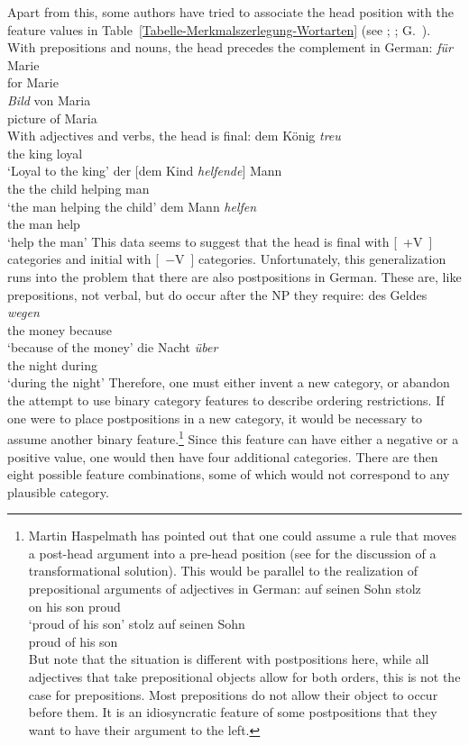 Apart from this, some authors have tried to associate the head position with the feature values in Table~\ref{Tabelle-Merkmalszerlegung-Wortarten} (see \eg \citealp[]{Grewendorf88a};
\citealp[]{Haftka96a}; G.\ \citealp[]{GMueller2011a}). With prepositions and nouns,
the head precedes the complement in German:
\eal
\ex
\gll \emph{für} Marie\\
	 for Marie\\
\ex 
\gll \emph{Bild} von Maria\\
	 picture of Maria\\
\zl
With adjectives and verbs, the head is final:
\eal
\ex 
\gll dem König \emph{treu}\\
     the king loyal\\
\glt `Loyal to the king'
\ex 
\gll der [dem Kind \emph{helfende}] Mann\\
     the the child helping man\\
\glt `the man helping the child'
\ex 
\gll dem Mann \emph{helfen}\\
     the man help\\
\glt `help the man'
\zl
This data seems to suggest that the head is final with [~+V~] categories and initial with [~$-$V~] categories. Unfortunately, this
generalization runs into the problem that there are also postpositions in German. These are, like
prepositions, not verbal, but do occur after the NP they require: 
\eal
\ex 
\gll des Geldes \emph{wegen}\\
     the money because\\
\glt `because of the money'
\ex 
\gll die Nacht \emph{über}\\
     the night during\\
\glt `during the night'
\zl
Therefore, one must either invent a new category, or abandon the attempt to use binary category features to describe ordering restrictions.
If one were to place postpositions in a new category, it would be necessary to assume another binary
feature.\footnote{%
Martin Haspelmath has pointed out that one could assume a rule that moves a
post-head argument into a pre-head position (see \citealp[]{Riemsdijk78a} for the discussion
of a transformational solution). This would be parallel to the realization of
prepositional arguments of adjectives in German:
\eal
\ex
\gll auf seinen Sohn stolz\\
     on  his son proud\\
\glt `proud of his son'
\ex 
\gll stolz auf seinen Sohn\\
     proud of his son\\
\zl
But note that the situation is different with postpositions here, while all adjectives that take
prepositional objects allow for both orders, this is not the case for prepositions. Most
prepositions do not allow their object to occur before them. It is an idiosyncratic feature of some
postpositions that they want to have their argument to the left.%
} 
Since this feature can have either a negative or a positive value, one would then have four
additional categories. There are then eight possible feature combinations, some of which would not
correspond to any plausible category.

